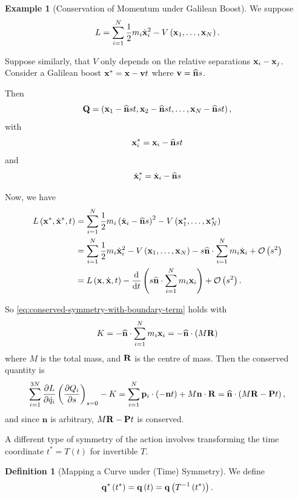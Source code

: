 \documentclass[11pt]{article}
\numberwithin{equation}{section}
\theoremstyle{definition}
\newtheorem{definition}[theorem]{Definition}
\newtheorem{example}[theorem]{Example}
\theoremstyle{remark}
\newcommand{\pqty}[1]{\left(#1\right)}
\newcommand{\inverse}{^{-1}}
\newcommand{\vdot}{\cdot}
\newcommand{\unitv}[1]{\widehat{\mathbf{#1}}}
\newcommand{\bigO}{\mathcal{O}}
\begin{document}
\begin{example}[Conservation of Momentum under Galilean Boost]\label{variation-unit-0080}
    We suppose
    \[
        L = \sum_{i = 1}^{N} \frac{1}{2} m_i \dot{\vb{x}}_i^2 - V\pqty{\vb{x}_1, \ldots, \vb{x}_N}.
    \]

    Suppose similarly, that \(V\) only depends on the relative separations \(\vb{x}_i - \vb{x}_j\). Consider a Galilean boost \(\vb{x}^{\ast} = \vb{x} - \vb{v} t\) where \(\vb{v} = \unitv{n} s\).

    Then
    \[
        \vb{Q} = \pqty{\vb{x}_1 - \unitv{n}st, \vb{x}_2 - \unitv{n}st, \ldots, \vb{x}_N - \unitv{n}st},
    \]
    with
    \[
        \vb{x}_i^{\ast} = \vb{x}_i - \unitv{n}st
    \]
    and
    \[
        \dot{\vb{x}}_i^{\ast} = \dot{\vb{x}}_i - \unitv{n}s
    \]

    Now, we have
    \begin{align*}
        L \pqty{\vb{x}^{\ast}, \dot{\vb{x}}^{\ast}, t} &= \sum_{i = 1}^{N} \frac{1}{2} m_i \pqty{\dot{\vb{x}}_i - \unitv{n}s}^2 - V \pqty{\vb{x}_1^{\ast}, \ldots, \vb{x}_N^{\ast}} \\
        &= \sum_{i = 1}^{N} \frac{1}{2} m_i \dot{\vb{x}}_i^2 - V\pqty{\vb{x}_1, \ldots, \vb{x}_N} - s \unitv{n} \vdot \sum_{i = 1}^{N} m_i \dot{\vb{x}}_i + \bigO \pqty{s^2} \\
        &= L\pqty{\vb{x}, \dot{\vb{x}}, t} - \dv{t} \pqty{s \unitv{n} \vdot \sum_{i = 1}^{N} m_i \vb{x}_i} + \bigO \pqty{s^2}.
    \end{align*}

    So \autoref{eq:conserved-symmetry-with-boundary-term} holds with
    \[
        K = - \unitv{n} \vdot \sum_{i = 1}^{N} m_i \vb{x}_i = - \unitv{n} \vdot \pqty{M \vb{R}}
    \]
    where \(M\) is the total mass, and \(\vb{R}\) is the centre of mass. Then the conserved quantity is
    \[
        \sum_{i = 1}^{3N} \pdv{L}{\dot{q}_i} \pqty{\pdv{Q_i}{s}}_{s = 0} - K = \sum_{i = 1}^{N} \vb{p}_i \vdot \pqty{- \vb{n} t} + M \vb{n} \vdot \vb{R} = \unitv{n} \vdot \pqty{M \vb{R} - \vb{P} t},
    \]
    and since \(\unitv{n}\) is arbitrary, \(M \vb{R} - \vb{P} t\) is conserved.
\end{example}

A different type of symmetry of the action involves transforming the time coordinate \(t^{\ast} = T \pqty{t}\) for invertible \(T\).

\begin{definition}[Mapping a Curve under (Time) Symmetry]\label{variation-unit-0081}
    We define
    \[
        \vb{q}^{\ast} \pqty{t^{\ast}} = \vb{q} \pqty{t} = \vb{q} \pqty{T \inverse \pqty{t^{\ast}}}.
    \]
\end{definition}
\end{document}
